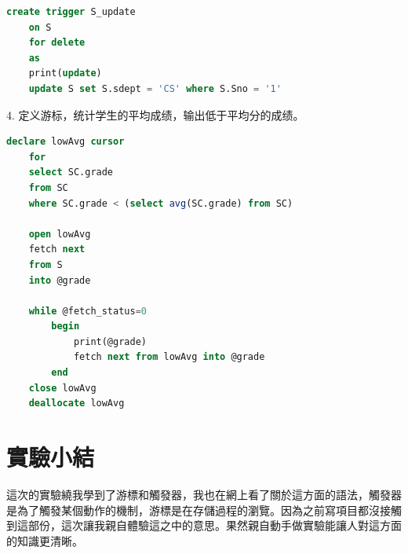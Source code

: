 \documentclass[12pt, a4paper]{report}
\begin{document}
\begin{lstlisting}[language=SQL]
    create trigger S_update
    on S
    for delete
    as
	print(update)
    update S set S.sdept = 'CS' where S.Sno = '1'
\end{lstlisting}

4. 定义游标，统计学生的平均成绩，输出低于平均分的成绩。

\begin{lstlisting}[language=SQL]
    declare lowAvg cursor
    for
	select SC.grade
	from SC
	where SC.grade < (select avg(SC.grade) from SC)

    open lowAvg
    fetch next
    from S
    into @grade

    while @fetch_status=0
        begin
	    	print(@grade)
            fetch next from lowAvg into @grade
        end
    close lowAvg
    deallocate lowAvg
\end{lstlisting}

\section{實驗小結}

這次的實驗繞我學到了游標和觸發器，我也在網上看了關於這方面的語法，觸發器是為了觸發某個動作的機制，游標是在存儲過程的瀏覽。因為之前寫項目都沒接觸到這部份，這次讓我親自體驗這之中的意思。果然親自動手做實驗能讓人對這方面的知識更清晰。
\end{document}
